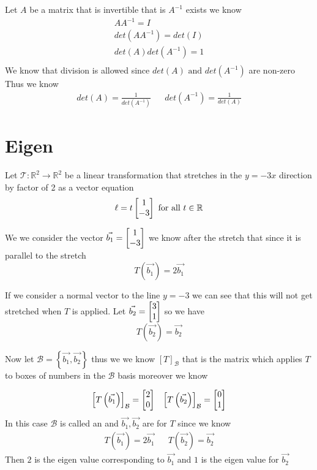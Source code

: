 \documentclass[11pt]{book}
\begin{document}
Let $A$ be a matrix that is invertible that is $A^{-1} $ exists we know
\begin{gather*}
    AA^{-1} = I\\
    \mathit{det} \left(AA^{-1} \right) = \mathit{det} \left(I\right) \\
    \mathit{det} \left(A\right) \mathit{det} \left(A^{-1} \right) = 1\\
\end{gather*}
We know that division is allowed since $\mathit{det} \left(A\right) \text{ and } \mathit{det} \left(A^{-1} \right) $ are non-zero 
Thus we know 
\begin{align*}
    \boxed{\mathit{det} \left(A\right) = \frac{1}{\mathit{det} \left(A^{-1} \right) }} && \boxed{\mathit{det} \left(A^{-1} \right) = \frac{1}{\mathit{det} \left(A\right) }}
\end{align*}



\section{Eigen}%
\label{sec:eigen}

Let $\mathcal{T}  : \mathbb{R} ^2  \to \mathbb{R} ^2  $ be a linear transformation that stretches in the $y= -3x$ direction by factor of 2 as a vector equation 
\[
\ell = t\begin{bmatrix} 1 \\ -3 \end{bmatrix} \text{ for all  } t \in \mathbb{R}
\]

We we consider the vector $\vec{b_1} = \begin{bmatrix} 1 \\ -3 \end{bmatrix} $ we know after the stretch that since it is parallel to the stretch
\[
T\left(\vec{b_1} \right) = 2 \vec{b_1} 
\]

If we consider a normal vector to the line $y= -3$ we can see that this will not get stretched when $T$ is applied. Let $\vec{b_2} = \begin{bmatrix} 3 \\ 1 \end{bmatrix} $ so we have
\[
    T\left(\vec{b_2} \right) = \vec{b_2} 
\]

Now let $\mathcal{B} = \left\{ \vec{b_1} ,\vec{b_2}  \right\} $ thus we we know $\left[ T \right]_{\mathcal{B}} $ that is the matrix which applies $T$ to boxes of numbers in the $\mathcal{B} $ basis moreover we know 

\begin{align*}
    \left[ T\left(\vec{b_1} \right)  \right]_{\mathcal{B}} = \begin{bmatrix} 2 \\ 0 \end{bmatrix}  && \left[ T\left(\vec{b_2} \right)  \right]_{\mathcal{B}} = \begin{bmatrix} 0 \\ 1 \end{bmatrix} 
\end{align*}
In this case $\mathcal{B} $ is called an  and $\vec{b_1} , \vec{b_2} $ are  for $T$ since we know 
\begin{align*}
    T\left(\vec{b_1} \right) = 2\vec{b_1}  && T\left(\vec{b_2} \right) = \vec{b_2} 
\end{align*}
Then $2$ is the eigen value corresponding to $\vec{b_1} $ and $1$ is the eigen value for $\vec{b_2} $  
\end{document}
